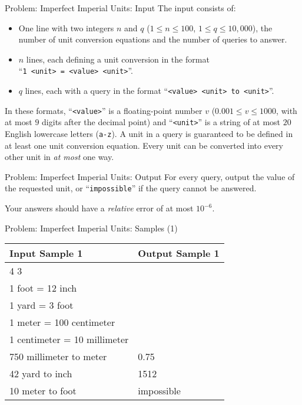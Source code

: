 \documentclass[11pt,pdf, aspectratio=169]{beamer}
\begin{document}
  \begin{frame}{Problem: Imperfect Imperial Units: Input}
    The input consists of:
    \vspace{-0.5em}%
    \begin{itemize}
      \item One line with two integers $n$ and $q$ ($1\leq n\leq 100$, $1\leq q\leq 10,000$),
      the number of unit conversion equations and the number of queries to answer.
      \item $n$ lines, each defining a unit conversion in the format\\ ``\texttt{1 <unit> = <value> <unit>}''.
      \item $q$ lines, each with a query in the format ``\texttt{<value> <unit> to <unit>}''.
    \end{itemize}

    \vspace{-0.5em}%
    In these formats, ``\texttt{<value>}'' is a floating-point number $v$
    ($0.001 \leq v \leq 1000$, with at most $9$ digits after the decimal point) and
    ``\texttt{<unit>}'' is a string of at most $20$ English lowercase letters (\texttt{a-z}).
    A unit in a query is guaranteed to be defined in at least one unit conversion equation.
    Every unit can be converted into every other unit in \emph{at most} one way.
  \end{frame}
  \begin{frame}{Problem: Imperfect Imperial Units: Output}
    For every query, output the value of the requested unit, or ``\texttt{impossible}'' if the query cannot be answered.

    Your answers should have a \emph{relative} error of at most $10^{-6}$.

  \end{frame}
  \begin{frame}{Problem: Imperfect Imperial Units: Samples (1)}
    \begin{tabular}{|l|l|}
      \hline
      Input Sample 1               & Output Sample 1 \\
      \hline
      4 3                          &                 \\
      1 foot = 12 inch             &                 \\
      1 yard = 3 foot              &                 \\
      1 meter = 100 centimeter     &                 \\
      1 centimeter = 10 millimeter &                 \\
      750 millimeter to meter      & 0.75            \\
      42 yard to inch              & 1512            \\
      10 meter to foot             & impossible      \\
      \hline
    \end{tabular}
  \end{frame}
\end{document}
